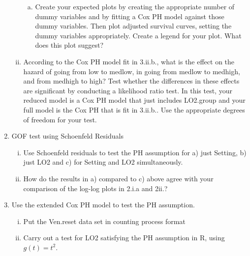 \documentclass[12pt]{article}
\begin{document}
\begin{enumerate}[1.]
\begin{enumerate}[i.]
\begin{enumerate}[a.]
\item Create your expected plots by creating the appropriate number of dummy variables and by fitting a Cox PH model against those dummy variables. Then plot adjusted survival curves, setting the dummy variables appropriately. Create a legend for your plot. What does this plot suggest?
\end{enumerate}
\item According to the Cox PH model fit in 3.ii.b., what is the effect on the hazard of going from low to medlow, in going from medlow to medhigh, and from medhigh to high? Test whether the differences in these effects are significant by conducting a likelihood ratio test. In this test, your reduced model is a Cox PH model that just includes LO2.group and your full model is the Cox PH that is fit in 3.ii.b.. Use the appropriate degrees of freedom for your test.
\end{enumerate}
\item GOF test using Schoenfeld Residuals
\begin{enumerate}[i.]
\item Use Schoenfeld residuals to test the PH assumption for a) just Setting, b) just LO2 and c) for Setting and LO2 simultaneously.
\item How do the results in a) compared to c) above agree with your comparison of the log-log plots in 2.i.a and 2ii.?
\end{enumerate}
\item Use the extended Cox PH model to test the PH assumption.
\begin{enumerate}[i.]
\item Put the Ven.reset data set in counting process format
\item Carry out a test for LO2 satisfying the PH assumption in R, using $g(t)=t^2$.
\end{enumerate}
\end{enumerate}
\end{document}
